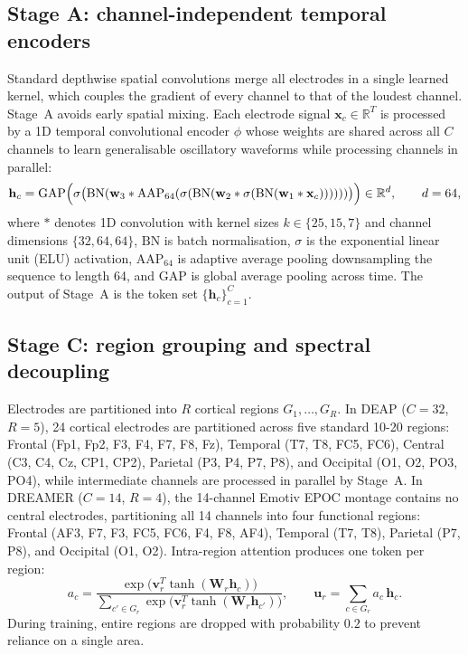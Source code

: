 \documentclass[a4paper,fleqn]{cas-sc}
\begin{document}
\subsection{Stage A: channel-independent temporal encoders}
Standard depthwise spatial convolutions merge all electrodes in a single learned kernel, which couples the gradient of every channel to that of the loudest channel. Stage~A avoids early spatial mixing. Each electrode signal $\mathbf{x}_c\in\mathbb{R}^{T}$ is processed by a 1D temporal convolutional encoder $\phi$ whose weights are shared across all $C$ channels to learn generalisable oscillatory waveforms while processing channels in parallel:
\begin{equation}
\mathbf{h}_c=\mathrm{GAP}\Bigl(\sigma\bigl(\mathrm{BN}(\mathbf{w}_3 * \mathrm{AAP}_{64}(\sigma(\mathrm{BN}(\mathbf{w}_2 * \sigma(\mathrm{BN}(\mathbf{w}_1 * \mathbf{x}_c))))))\bigr)\Bigr)\in\mathbb{R}^{d},\qquad d=64,
\end{equation}
where $*$ denotes 1D convolution with kernel sizes $k \in \{25, 15, 7\}$ and channel dimensions $\{32, 64, 64\}$, $\mathrm{BN}$ is batch normalisation, $\sigma$ is the exponential linear unit (ELU) activation, $\mathrm{AAP}_{64}$ is adaptive average pooling downsampling the sequence to length 64, and $\mathrm{GAP}$ is global average pooling across time. The output of Stage~A is the token set $\{\mathbf{h}_c\}_{c=1}^{C}$.

\subsection{Stage C: region grouping and spectral decoupling}
Electrodes are partitioned into $R$ cortical regions $G_1,\dots,G_R$. In DEAP ($C=32$, $R=5$), 24 cortical electrodes are partitioned across five standard 10-20 regions: Frontal (Fp1, Fp2, F3, F4, F7, F8, Fz), Temporal (T7, T8, FC5, FC6), Central (C3, C4, Cz, CP1, CP2), Parietal (P3, P4, P7, P8), and Occipital (O1, O2, PO3, PO4), while intermediate channels are processed in parallel by Stage~A. In DREAMER ($C=14$, $R=4$), the 14-channel Emotiv EPOC montage contains no central electrodes, partitioning all 14 channels into four functional regions: Frontal (AF3, F7, F3, FC5, FC6, F4, F8, AF4), Temporal (T7, T8), Parietal (P7, P8), and Occipital (O1, O2). Intra-region attention produces one token per region:
\begin{equation}
a_c=\frac{\exp\bigl(\mathbf{v}_r^{T}\tanh(\mathbf{W}_r\mathbf{h}_c)\bigr)}{\sum_{c'\in G_r}\exp\bigl(\mathbf{v}_r^{T}\tanh(\mathbf{W}_r\mathbf{h}_{c'})\bigr)},\qquad
\mathbf{u}_r=\sum_{c\in G_r}a_c\,\mathbf{h}_c.
\end{equation}
During training, entire regions are dropped with probability $0.2$ to prevent reliance on a single area.
\end{document}
